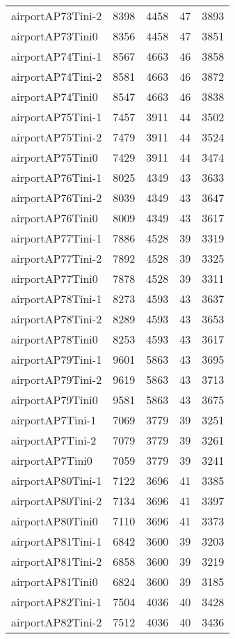 \documentclass[../../../thesis.tex]{subfiles}
\begin{document}
\begin{longtable}{lrrrr}
airportAP73Tini-2 & 8398 & 4458 & 47 & 3893 \\
airportAP73Tini0 & 8356 & 4458 & 47 & 3851 \\
airportAP74Tini-1 & 8567 & 4663 & 46 & 3858 \\
airportAP74Tini-2 & 8581 & 4663 & 46 & 3872 \\
airportAP74Tini0 & 8547 & 4663 & 46 & 3838 \\
airportAP75Tini-1 & 7457 & 3911 & 44 & 3502 \\
airportAP75Tini-2 & 7479 & 3911 & 44 & 3524 \\
airportAP75Tini0 & 7429 & 3911 & 44 & 3474 \\
airportAP76Tini-1 & 8025 & 4349 & 43 & 3633 \\
airportAP76Tini-2 & 8039 & 4349 & 43 & 3647 \\
airportAP76Tini0 & 8009 & 4349 & 43 & 3617 \\
airportAP77Tini-1 & 7886 & 4528 & 39 & 3319 \\
airportAP77Tini-2 & 7892 & 4528 & 39 & 3325 \\
airportAP77Tini0 & 7878 & 4528 & 39 & 3311 \\
airportAP78Tini-1 & 8273 & 4593 & 43 & 3637 \\
airportAP78Tini-2 & 8289 & 4593 & 43 & 3653 \\
airportAP78Tini0 & 8253 & 4593 & 43 & 3617 \\
airportAP79Tini-1 & 9601 & 5863 & 43 & 3695 \\
airportAP79Tini-2 & 9619 & 5863 & 43 & 3713 \\
airportAP79Tini0 & 9581 & 5863 & 43 & 3675 \\
airportAP7Tini-1 & 7069 & 3779 & 39 & 3251 \\
airportAP7Tini-2 & 7079 & 3779 & 39 & 3261 \\
airportAP7Tini0 & 7059 & 3779 & 39 & 3241 \\
airportAP80Tini-1 & 7122 & 3696 & 41 & 3385 \\
airportAP80Tini-2 & 7134 & 3696 & 41 & 3397 \\
airportAP80Tini0 & 7110 & 3696 & 41 & 3373 \\
airportAP81Tini-1 & 6842 & 3600 & 39 & 3203 \\
airportAP81Tini-2 & 6858 & 3600 & 39 & 3219 \\
airportAP81Tini0 & 6824 & 3600 & 39 & 3185 \\
airportAP82Tini-1 & 7504 & 4036 & 40 & 3428 \\
airportAP82Tini-2 & 7512 & 4036 & 40 & 3436 \\

\end{longtable}
\end{document}
